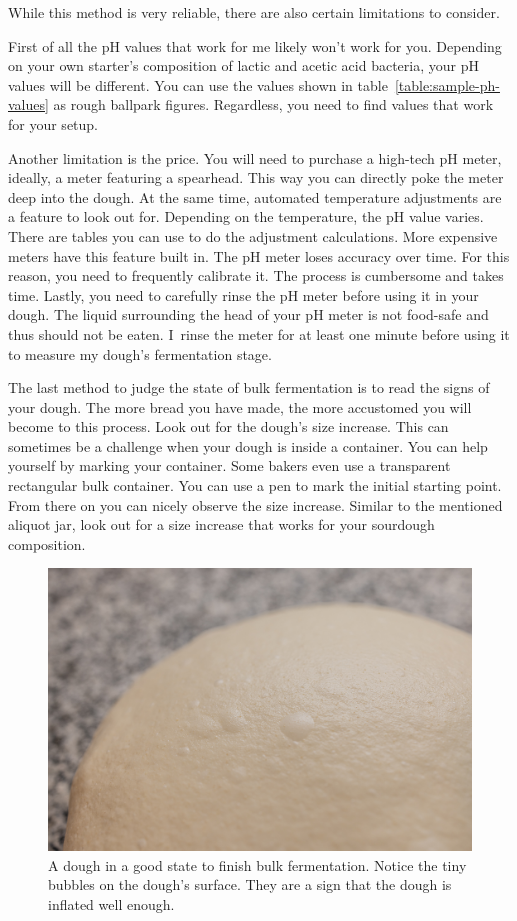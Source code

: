While this method is very reliable, there are also certain
limitations to consider.

First of all the pH values that work for me likely won't work for
you. Depending on your own starter's composition of lactic
and acetic acid bacteria, your pH values will be different.
You can use the values shown in table~\ref{table:sample-ph-values}
as rough ballpark figures. Regardless, you need to find values
that work for your setup.

Another limitation is the price. You will need to purchase
a high-tech pH meter, ideally, a meter featuring a spearhead.
This way you can directly poke the meter deep into the dough.
At the same time, automated temperature adjustments are a
feature to look out for. Depending on the temperature,
the pH value varies. There are tables you can use to
do the adjustment calculations. More expensive meters
have this feature built in. The pH meter loses accuracy
over time. For this reason, you need to frequently
calibrate it. The process is cumbersome and takes time.
Lastly, you need to carefully rinse the pH meter before
using it in your dough. The liquid surrounding the
head of your pH meter is not food-safe and thus should
not be eaten. I~rinse the meter for at least one minute
before using it to measure my dough's fermentation stage.

The last method to judge the state of bulk fermentation
is to read the signs of your dough. The more bread you have
made, the more accustomed you will become to this process.
Look out for the dough's size increase. This can sometimes
be a challenge when your dough is inside a container.
You can help yourself by marking your container. Some bakers
even use a transparent rectangular bulk container. You
can use a pen to mark the initial starting point. From there
on you can nicely observe the size increase. Similar to the
mentioned aliquot jar, look out for a size increase that works
for your sourdough composition.

\begin{figure}[!htb]
  \includegraphics[width=\textwidth]{bulk-finished-dough}
  \caption{A dough in a good state to finish bulk fermentation. Notice
  the tiny bubbles on the dough's surface. They are a sign that the dough
  is inflated well enough.}
\end{figure}

